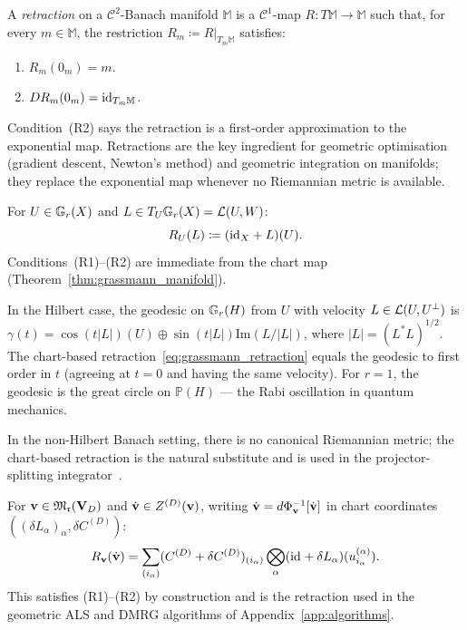 \begin{definition}
\label{def:retraction}
A \emph{retraction} on a $\mathcal{C}^2$-Banach manifold $\mathbb{M}$
is a $\mathcal{C}^1$-map $R: T\mathbb{M} \to \mathbb{M}$ such that,
for every $m \in \mathbb{M}$, the restriction $R_m \coloneqq
R|_{T_m\mathbb{M}}$ satisfies:
\begin{enumerate}
\item[\textup{(R1)}] $R_m(0_m) = m$.
\item[\textup{(R2)}] $DR_m(0_m) = \mathrm{id}_{T_m\mathbb{M}}$.
\end{enumerate}
\end{definition}

Condition~(R2) says the retraction is a first-order approximation to
the exponential map. Retractions are the key ingredient for geometric
optimisation (gradient descent, Newton's method) and geometric
integration on manifolds; they replace the exponential map whenever
no Riemannian metric is available.

\begin{example}
\label{ex:grassmann_retraction}
For $U \in \mathbb{G}_{r}(X)$ and $L \in T_U\mathbb{G}_{r}(X) = \mathcal{L}(U, W)$:
\begin{equation}
\label{eq:grassmann_retraction}
    R_U(L) \coloneqq (\mathrm{id}_{X} + L)(U).
\end{equation}
Conditions~(R1)--(R2) are immediate from the chart map
(Theorem~\ref{thm:grassmann_manifold}).
\end{example}

\begin{remark}
\label{rem:retraction_vs_exp}
In the Hilbert case, the geodesic on $\mathbb{G}_{r}(H)$ from $U$ with
velocity $L \in \mathcal{L}(U, U^\perp)$ is
$\gamma(t) = \cos(t|L|)(U) \oplus \sin(t|L|)\mathrm{Im}(L/|L|)$,
where $|L| = (L^*L)^{1/2}$. The chart-based retraction~\eqref{eq:grassmann_retraction}
equals the geodesic to first order in $t$ (agreeing at $t=0$ and having
the same velocity). For $r=1$, the geodesic is the great circle on
$\mathbb{P}(H)$ — the Rabi oscillation in quantum mechanics.

In the non-Hilbert Banach setting, there is no canonical Riemannian
metric; the chart-based retraction is the natural substitute and is
used in the projector-splitting
integrator~\cite{LubichOseledetsVandereycken2015}.
\end{remark}

\begin{example}
\label{ex:tucker_retraction}
For $\mathbf{v} \in \mathfrak{M}_{\mathfrak{r}}(\mathbf{V}_D)$ and $\dot{\mathbf{v}} \in Z^{(D)}(\mathbf{v})$, writing
$\dot{\mathbf{v}} = d\Phi_{\mathbf{v}}^{-1}[\dot{\mathbf{v}}]$ in chart coordinates
$((\delta L_\alpha)_\alpha, \delta C^{(D)})$:
\begin{equation}
\label{eq:tucker_retraction}
    R_{\mathbf{v}}(\dot{\mathbf{v}})
    = \sum_{(i_\alpha)}
    (C^{(D)} + \delta C^{(D)})_{(i_\alpha)}
    \bigotimes_\alpha
    (\mathrm{id}_{} + \delta L_\alpha)(u^{(\alpha)}_{i_\alpha}).
\end{equation}
This satisfies (R1)--(R2) by construction and is the retraction used
in the geometric ALS and DMRG algorithms of
Appendix~\ref{app:algorithms}.
\end{example}

